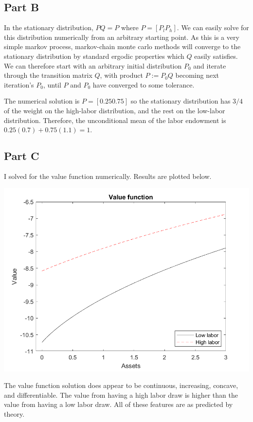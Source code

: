 \documentclass[11pt]{article} %
\begin{document}
\subsection{Part B}
In the stationary distribution, $PQ = P$ where $P = [P_l P_h]$. We can easily solve for this distribution numerically from an arbitrary starting point. As this is a very simple markov process, markov-chain monte carlo methods will converge to the stationary distribution by standard ergodic properties which $Q$ easily satisfies. We can therefore start with an arbitrary initial distribution $P_0$ and iterate through the transition matrix $Q$, with product $P:=P_0Q$ becoming next iteration's $P_0$, until $P$ and $P_0$ have converged to some tolerance. 

The numerical solution is $P = [0.25 0.75] $ so the stationary distribution has $3/4 $ of the weight on the high-labor distribution, and the rest on the low-labor distribution. Therefore, the unconditional mean of the labor endowment is $0.25(0.7) + 0.75(1.1) = 1$.

\subsection{Part C}
I solved for the value function numerically. Results are plotted below.

\includegraphics{valfunc}

The value function solution does appear to be continuous, increasing, concave, and differentiable. The value from having a high labor draw is higher than the value from having a low labor draw. All of these features are as predicted by theory.
\end{document}

